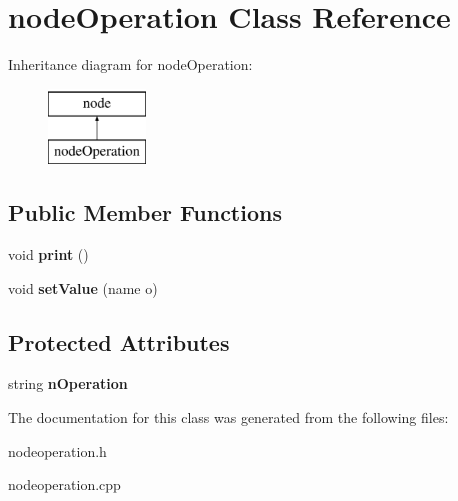 \hypertarget{classnodeOperation}{\section{node\-Operation \-Class \-Reference}
\label{classnodeOperation}
}
\-Inheritance diagram for node\-Operation\-:\begin{figure}[H]
\begin{center}
\leavevmode
\includegraphics[height=2.000000cm]{classnodeOperation}
\end{center}
\end{figure}
\subsection*{\-Public \-Member \-Functions}
\begin{DoxyCompactItemize}
\item 
\hypertarget{classnodeOperation_afd47201286378d1a36183ad015b28562}{void {\bfseries print} ()}\label{classnodeOperation_afd47201286378d1a36183ad015b28562}

\item 
\hypertarget{classnodeOperation_a3c8f1b0b66fdc8b81b1b4a1bee069f42}{void {\bfseries set\-Value} (name o)}\label{classnodeOperation_a3c8f1b0b66fdc8b81b1b4a1bee069f42}

\end{DoxyCompactItemize}
\subsection*{\-Protected \-Attributes}
\begin{DoxyCompactItemize}
\item 
\hypertarget{classnodeOperation_aa590af77049d1777ebe268cb88ae5d4d}{string {\bfseries n\-Operation}}\label{classnodeOperation_aa590af77049d1777ebe268cb88ae5d4d}

\end{DoxyCompactItemize}


\-The documentation for this class was generated from the following files\-:\begin{DoxyCompactItemize}
\item 
nodeoperation.\-h\item 
nodeoperation.\-cpp\end{DoxyCompactItemize}
